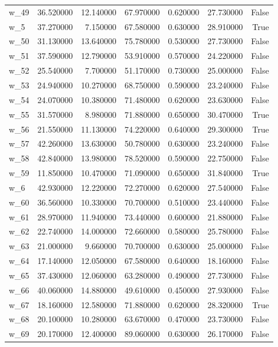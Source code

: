 \begin{table}
\begin{tabular}{lrrrrrr}
w\_49 & 36.520000 & 12.140000 & 67.970000 & 0.620000 & 27.730000 & False \\
w\_5 & 37.270000 & 7.150000 & 67.580000 & 0.630000 & 28.910000 & True \\
w\_50 & 31.130000 & 13.640000 & 75.780000 & 0.530000 & 27.730000 & False \\
w\_51 & 37.590000 & 12.790000 & 53.910000 & 0.570000 & 24.220000 & False \\
w\_52 & 25.540000 & 7.700000 & 51.170000 & 0.730000 & 25.000000 & False \\
w\_53 & 24.940000 & 10.270000 & 68.750000 & 0.590000 & 23.240000 & False \\
w\_54 & 24.070000 & 10.380000 & 71.480000 & 0.620000 & 23.630000 & False \\
w\_55 & 31.570000 & 8.980000 & 71.880000 & 0.650000 & 30.470000 & True \\
w\_56 & 21.550000 & 11.130000 & 74.220000 & 0.640000 & 29.300000 & True \\
w\_57 & 42.260000 & 13.630000 & 50.780000 & 0.630000 & 23.240000 & False \\
w\_58 & 42.840000 & 13.980000 & 78.520000 & 0.590000 & 22.750000 & False \\
w\_59 & 11.850000 & 10.470000 & 71.090000 & 0.650000 & 31.840000 & True \\
w\_6 & 42.930000 & 12.220000 & 72.270000 & 0.620000 & 27.540000 & False \\
w\_60 & 36.560000 & 10.330000 & 70.700000 & 0.510000 & 23.440000 & False \\
w\_61 & 28.970000 & 11.940000 & 73.440000 & 0.600000 & 21.880000 & False \\
w\_62 & 22.740000 & 14.000000 & 72.660000 & 0.580000 & 25.780000 & False \\
w\_63 & 21.000000 & 9.660000 & 70.700000 & 0.630000 & 25.000000 & False \\
w\_64 & 17.140000 & 12.050000 & 67.580000 & 0.640000 & 18.160000 & False \\
w\_65 & 37.430000 & 12.060000 & 63.280000 & 0.490000 & 27.730000 & False \\
w\_66 & 40.060000 & 14.880000 & 49.610000 & 0.450000 & 27.930000 & False \\
w\_67 & 18.160000 & 12.580000 & 71.880000 & 0.620000 & 28.320000 & True \\
w\_68 & 20.100000 & 10.280000 & 63.670000 & 0.470000 & 23.730000 & False \\
w\_69 & 20.170000 & 12.400000 & 89.060000 & 0.630000 & 26.170000 & False \\

\end{tabular}
\end{table}

